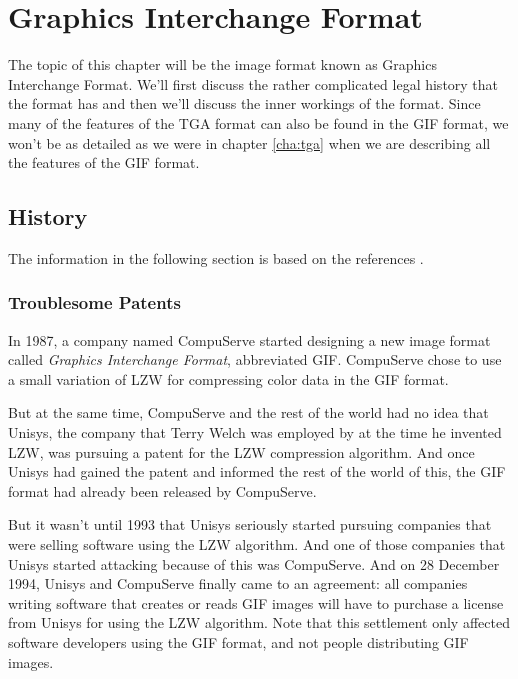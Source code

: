 \begin{comment}
  
\end{comment}

\chapter{Graphics Interchange Format}
\label{cha:gif}

The topic of this chapter will be the image format known as Graphics
Interchange Format. We'll first discuss the rather complicated legal
history that the format has and then we'll discuss the inner workings
of the format. Since many of the features of the TGA format can also
be found in the GIF format, we won't be as detailed as we were in
chapter \ref{cha:tga} when we are describing all the features of the
GIF format.

\section{History}
\label{sec:gif-history}

The information in the following section is based on the references
\cite{welch85:_u,roelofs09:_histor_portab_networ_graph_png_format,battilana:_gif_contr,caie:_sad,roelofs99:_png}.


\subsection{Troublesome Patents}

\newcommand{\compus}{CompuServe\xspace}

In 1987, a company named \compus started designing a new image format
called \textit{Graphics Interchange Format}, abbreviated GIF. \compus
chose to use a small variation of LZW for compressing color data in
the GIF format.

But at the same time, \compus and the rest of the world had no idea
that Unisys, the company that Terry Welch was employed by at the time
he invented LZW, was pursuing a patent for the LZW compression
algorithm. And once Unisys had gained the patent and informed the rest
of the world of this, the GIF format had already been released by
\compus.

But it wasn't until 1993 that Unisys seriously started pursuing
companies that were selling software using the LZW algorithm. And one
of those companies that Unisys started attacking because of this was
\compus. And on 28 December 1994, Unisys and \compus finally came to
an agreement: all companies writing software that creates or reads GIF
images will have to purchase a license from Unisys for using the LZW
algorithm. Note that this settlement only affected software developers using the
GIF format, and not people distributing GIF images.

